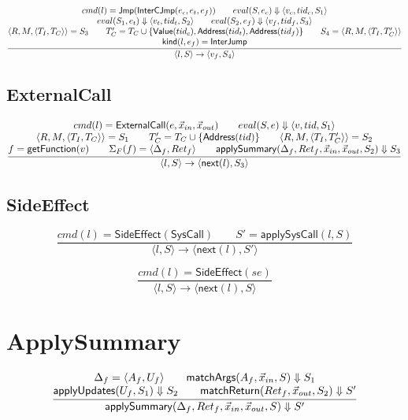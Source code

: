 \documentclass{article}
\newcommand{\step}[4]{\langle #1,#2\rangle \rightarrow \langle #3,#4\rangle}
\newcommand{\nexti}{\mathsf{next}}
\newcommand{\eval}[3]{eval(#1,#2) \Downarrow #3}
\begin{document}
\[
\frac{
    \begin{array}{@{}c@{}}
        cmd(l)=\mathsf{Jmp}(\mathsf{InterCJmp}(e_c,e_t,e_f)) \qquad
        \eval{S}{e_c}{\langle v_c, tid_c,S_1\rangle} \\
        
        \eval{S_1}{e_t}{\langle v_t,tid_t,S_2\rangle} \qquad
        \eval{S_2}{e_f}{\langle v_f,tid_f,S_3\rangle} \\

        \langle R,M,\langle T_I,T_C\rangle\rangle = S_3\qquad
        T_C'=T_C \cup \{ \mathsf{Value}(tid_c), \mathsf{Address}(tid_t), \mathsf{Address}(tid_f) \}\qquad
        S_4=\langle R,M,\langle T_I,T_C'\rangle\rangle\\
        
        \mathsf{kind}(l,e_f)=\mathsf{InterJump}
    \end{array}
} { \step{l}{S}{v_f}{S_4} }
\]

\subsection{ExternalCall}
\[
\frac{
    \begin{array}{@{}c@{}}
        cmd(l)=\mathsf{ExternalCall}(e,\vec{x}_{in},\vec{x}_{out}) \qquad
        \eval{S}{e}{\langle v, tid, S_1\rangle} \\

        \langle R,M,\langle T_I,T_C\rangle\rangle = S_1\qquad
        T_C'=T_C \cup \{\mathsf{Address}(tid)\}\qquad
        \langle R,M,\langle T_I,T_C'\rangle\rangle = S_2\\

        f=\mathsf{getFunction}(v) \qquad
        \Sigma_F(f)=\langle \Delta_f,Ret_f\rangle \qquad
        
        \mathsf{applySummary}(\Delta_f,Ret_f,\vec{x}_{in},\vec{x}_{out},S_2)\Downarrow S_3
    \end{array}
} { \step{l}{S}{\nexti(l)}{S_3} }
\]

\subsection{SideEffect}
\[
\frac{
    cmd(l)=\mathsf{SideEffect}(\mathsf{SysCall}) \qquad
    S'=\mathsf{applySysCall}(l,S)
} { \step{l}{S}{\nexti(l)}{S'} }
\]

\[
\frac{
    cmd(l)=\mathsf{SideEffect}(se)
} { \step{l}{S}{\nexti(l)}{S} }
\]

\section{ApplySummary}

\[
\frac{
    \begin{array}{@{}c@{}}
        \Delta_f=\langle A_f,U_f\rangle \qquad
        \mathsf{matchArgs}(A_f,\vec{x}_{in},S)\Downarrow S_1\\
        \mathsf{applyUpdates}(U_f,S_1)\Downarrow S_2 \qquad
        \mathsf{matchReturn}(Ret_f,\vec{x}_{out},S_2)\Downarrow S'
    \end{array}
}{
    \mathsf{applySummary}(\Delta_f,Ret_f,\vec{x}_{in},\vec{x}_{out},S)\Downarrow S'
}
\]
\end{document}
